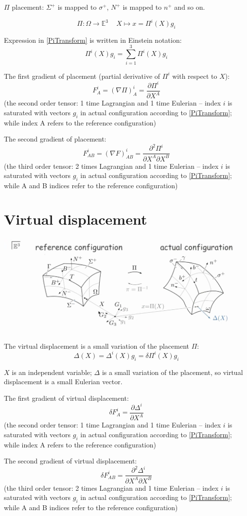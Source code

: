 \documentclass[a4paper,12pt]{article}
\newcommand{\beq}{\begin{equation}}
\newcommand{\eeq}{\end{equation}}
\begin{document}
$\Pi$ placement: $\Sigma^+$ is mapped to $\sigma^+$, $N^+$ is mapped to $n^+$ and so on.

\beq\label{PiTransform}
\Pi: \Omega\rightarrow\mathbb{E}^3\,\,\,\,\,\,\,X\mapsto x=\Pi^i(X)g_i
\eeq

Expression in \eqref{PiTransform} is written in Einstein notation:
\beq
\Pi^i(X)g_i=\sum\limits_{i=1}^3\Pi^i(X)g_i
\eeq

The first gradient of placement (partial derivative of $\Pi^i$ with respect to $X$):
\beq
F_A^i=(\nabla\Pi)_A^i=\frac{\partial\Pi^i}{\partial X^A}
\eeq
(the second order tensor: 1 time Lagrangian and 1 time Eulerian -- index $i$ is saturated with vectors $g_i$ in actual configuration according to \eqref{PiTransform}; while index A refers to the reference configuration)


The second gradient of placement:
\beq
F_{AB}^i=(\nabla F)_{AB}^i=\frac{\partial^2\Pi^i}{\partial X^A\partial X^B}
\eeq
(the third order tensor: 2 times Lagrangian and 1 time Eulerian -- index $i$ is saturated with vectors $g_i$ in actual configuration according to \eqref{PiTransform}; while A and B indices refer to the reference configuration)

\newpage

\section{Virtual displacement}
\includegraphics[width=\textwidth]{VirtualDisplacement}

The virtual displacement is a small variation of the placement $\Pi$:
\beq
\Delta(X)=\Delta^i(X)g_i=\delta\Pi^i(X)g_i
\eeq

$X$ is an independent variable; $\Delta$ is a small variation of the placement, so virtual displacement is a small Eulerian vector.

The first gradient of virtual displacement:
\beq
\delta F_A^i=\frac{\partial\Delta^i}{\partial X^A}
\eeq
(the second order tensor: 1 time Lagrangian and 1 time Eulerian -- index $i$ is saturated with vectors $g_i$ in actual configuration according to \eqref{PiTransform}; while index A refers to the reference configuration)

The second gradient of virtual displacement:
\beq
\delta F_{AB}^i=\frac{\partial^2\Delta^i}{\partial X^A\partial X^B}
\eeq
(the third order tensor: 2 times Lagrangian and 1 time Eulerian -- index $i$ is saturated with vectors $g_i$ in actual configuration according to \eqref{PiTransform}; while A and B indices refer to the reference configuration)
\end{document}
